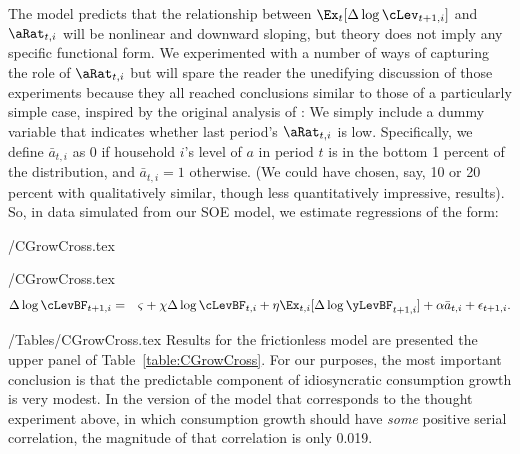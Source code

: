 \documentclass[titlepage]{\econtex}
\begin{document}
The model predicts that the relationship between $\Ex_{t}[\Delta \log \cLev_{t+1,i}]$ and $\aRat_{t,i}$ will be nonlinear and downward sloping, but theory does not imply any specific functional form.  We experimented with a number of ways of capturing the role of $\aRat_{t,i}$ but will spare the reader the unedifying discussion of those experiments because they all reached conclusions similar to those of a particularly simple case, inspired by the original analysis of \cite{zeldes:jpe}: We simply include a dummy variable that indicates whether last period's $\aRat_{t,i}$ is low.  Specifically, we define $\bar{a}_{t,i}$ as 0 if household $i$'s level of ${a}$ in period $t$ is in the bottom 1 percent of the distribution, and $\bar{a}_{t,i}=1$ otherwise.  (We could have chosen, say, 10 or 20 percent with qualitatively similar, though less quantitatively impressive, results). So, in data simulated from our SOE model, we estimate regressions of the form: %
\begin{verbatimwrite}{\eq/CGrowCross.tex}
   \newcommand{\CGrowCross}{\Delta \log       \cLevBF _{t+1,i}  &=&  \varsigma + \chi \Delta \log      \cLevBF _{t,i} + \eta     {\Ex}_{t,i}[\Delta \log       \yLevBF _{t+1,i}]+ {\alpha} \bar{a}_{t,i}+\epsilon_{t+1,i}.}
\newcommand{\CGrowCrossBar}{\Delta \log  \perc{\cLevBF}_{t+1,i}  &=&  \varsigma + \chi \Delta \log \perc{\cLevBF}_{t,i} + \eta     {\Ex}_{t,i}[\Delta \log \perc{\yLevBF}_{t+1,i}] + {\alpha} {\perc{a}}_{t,i}+\epsilon_{t+1,i}.}
\end{verbatimwrite}
 \eq/CGrowCross.tex
\begin{eqnarray*}
\CGrowCross
\end{eqnarray*}

\econtexRoot/Tables/CGrowCross.tex
Results for the frictionless model are presented the upper panel of Table~\ref{table:CGrowCross}.
For our purposes, the most important conclusion is that the predictable component of idiosyncratic consumption growth is very modest.  In the version of the model that corresponds to the thought experiment above, in which consumption growth should have {\it some} positive serial correlation, the magnitude of that correlation is only 0.019. %
\end{document}
